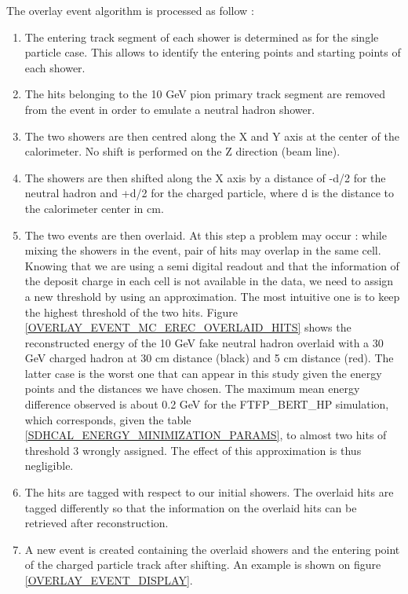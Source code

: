 \documentclass[cits]{JINST}
\begin{document}
The overlay event algorithm is processed as follow :

\begin{enumerate}
  \item The entering track segment of each shower is determined as for the single particle case. This allows to identify the entering points and starting points of each shower.
  \item The hits belonging to the 10 GeV pion primary track segment are removed from the event in order to emulate a neutral hadron shower.
  \item The two showers are then centred along the X and Y axis at the center of the calorimeter. No shift is performed on the Z direction (beam line).
  \item The showers are then shifted along the X axis by a distance of -d/2 for the neutral hadron and +d/2 for the charged particle, where d is the distance to the calorimeter center in cm.
  \item The two events are then overlaid. At this step a problem may occur : while mixing the showers in the event, pair of hits may overlap in the same cell. Knowing that we are using a semi digital readout and that the information of the deposit charge in each cell is not available in the data, we need to assign a new threshold by using an approximation. The most intuitive one is to keep the highest threshold of the two hits. Figure \ref{OVERLAY_EVENT_MC_EREC_OVERLAID_HITS} shows the reconstructed energy of the 10 GeV fake neutral hadron overlaid with a 30 GeV charged hadron at 30 cm distance (black) and 5 cm distance (red). The latter case is the worst one that can appear in this study given the energy points and the distances we have chosen. The maximum mean energy difference observed is about 0.2 GeV for the FTFP\_BERT\_HP simulation, which corresponds, given the table \ref{SDHCAL_ENERGY_MINIMIZATION_PARAMS}, to almost two hits of threshold 3 wrongly assigned. The effect of this approximation is thus negligible.
  \item The hits are tagged with respect to our initial showers. The overlaid hits are tagged differently so that the information on the overlaid hits can be retrieved after reconstruction.
  \item A new event is created containing the overlaid showers and the entering point of the charged particle track after shifting. An example is shown on figure \ref{OVERLAY_EVENT_DISPLAY}.
\end{enumerate}
\end{document}

